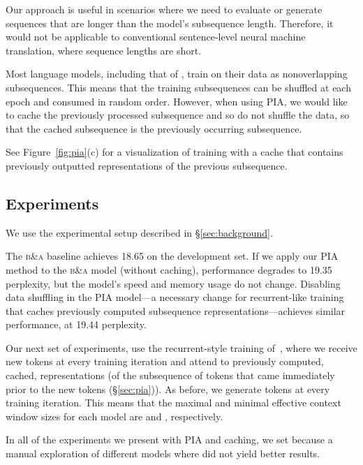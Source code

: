 \documentclass[11pt,a4paper]{article}
\newcommand{\ba}{\textsc{b\&a}\xspace}
\begin{document}
Our approach is useful in scenarios where we need to evaluate or generate sequences that are longer than the model's subsequence length. Therefore, it would not be applicable to conventional sentence-level neural machine translation, where sequence lengths are short.




Most language models, including that of \citet{baevski}, train on their data as nonoverlapping subsequences. 
This means that the training subsequences can be shuffled at each epoch and consumed in random order. However, when using PIA, we would like to cache the previously processed subsequence and so do not shuffle the data, so that the cached subsequence is the previously occurring subsequence. 



See Figure~\ref{fig:pia}(c) for a visualization of training with a cache that contains previously outputted representations of the previous subsequence. 


 \subsection{Experiments} \label{sec:pia_results}


We use the experimental setup described in \S\ref{sec:background}.


The \ba baseline achieves 18.65 on the development set.
If we apply our PIA method to the \ba model (without caching), performance degrades to 19.35 perplexity, but the model's speed and memory usage do not change. Disabling data shuffling in the PIA model---a necessary change for recurrent-like training that caches previously computed subsequence representations---achieves similar performance, at 19.44 perplexity. 



Our next set of experiments, use the recurrent-style training of~\citet{transformer-xl}, where we receive  new tokens at every training iteration and attend to  previously computed, cached, representations (of the subsequence of tokens that came immediately prior to the  new tokens (\S\ref{sec:pia})). As before, we generate  tokens at every training iteration.
This means that the maximal and minimal effective context window sizes for each model are  and , respectively. 


In all of the experiments we present with PIA and caching, we set  because a manual exploration of different models where  did not yield better results. 
\end{document}

